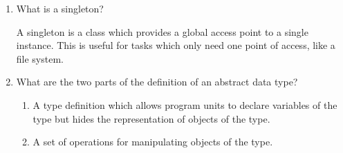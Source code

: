 \begin{enumerate}
\begin{answer}
  \end{answer}

  \item What is a singleton?

  \begin{answer}

    A singleton is a class which provides a global
    access point to a single instance. This is useful
    for tasks which only need one point of access,
    like a file system.

  \end{answer}

  \item What are the two parts of the definition 
    of an abstract data type?

  \begin{answer}

    \begin{enumerate}
      \item A type definition which allows program units
      to declare variables of the type but hides the
      representation of objects of the type.
      \item A set of operations for manipulating objects
      of the type.
    \end{enumerate}

  \end{answer}
\end{enumerate}
